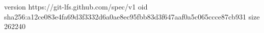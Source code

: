 version https://git-lfs.github.com/spec/v1
oid sha256:a12ce083e4fa69d3f3332d6a0ae8ec95fbb83d3f647aaf0a5c065ccce87cb931
size 262240
